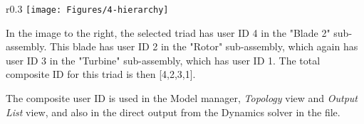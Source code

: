 \begin{wrapfigure}{r}{0.3\textwidth}
  \baselineskip
  \texttt{[image: Figures/4-hierarchy]}
\end{wrapfigure}

In the image to the right, the selected triad \newline
has user ID 4 in the "Blade 2" sub-assembly.
This blade has user ID 2 in the "Rotor" sub-assembly,
which again has user ID 3 in the "Turbine" sub-assembly, which has user ID 1.
The total composite ID for this triad is then [4,2,3,1].

The composite user ID is used in the Model \newline manager,
{\sl Topology} view and {\sl Output List} view, \newline
and also in the direct output from the Dynamics \newline
solver in the  file.

\clearpage
{}

